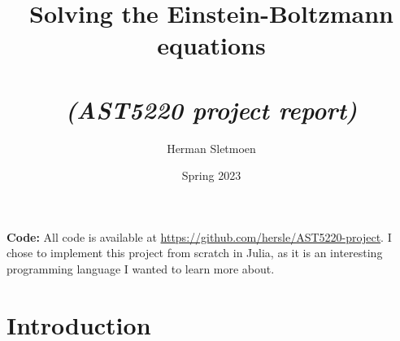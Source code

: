 \documentclass[10pt,a4paper]{article}
\begin{document}
\title{\textbf{Solving the Einstein-Boltzmann equations}\\ \\\normalsize\textit{(AST5220 project report)}}
\author{Herman Sletmoen}

\date{Spring 2023}

\iffalse
\abstract
{Solve Einstein-Boltzmann equations}
{Solve Einstein-Boltzmann equations}
{Solve Einstein-Boltzmann equations}
{Solve Einstein-Boltzmann equations}
{Solve Einstein-Boltzmann equations}
\fi


\maketitle
\tableofcontents
%


\bigskip \bigskip \bigskip

\noindent
\textbf{Code:}
All code is available at \href{https://github.com/hersle/AST5220-project}{https://github.com/hersle/AST5220-project}.
I chose to implement this project from scratch in Julia,
as it is an interesting programming language I wanted to learn more about.

\clearpage

\setcounter{section}{-1}
\section{Introduction}
\label{sec_intro}
\end{document}
